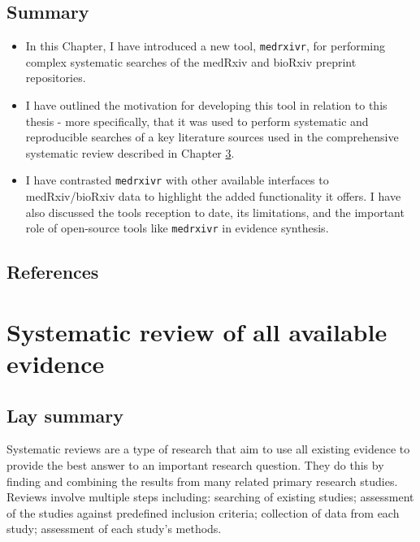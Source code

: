 \documentclass[a4paper, twoside]{templates/ociamthesis}
\begin{document}
\hypertarget{summary-1}{%
\section{Summary}\label{summary-1}}

\begin{itemize}
\item
  In this Chapter, I have introduced a new tool, \texttt{medrxivr}, for performing complex systematic searches of the medRxiv and bioRxiv preprint repositories.
\item
  I have outlined the motivation for developing this tool in relation to this thesis - more specifically, that it was used to perform systematic and reproducible searches of a key literature sources used in the comprehensive systematic review described in Chapter \ref{sys-rev-heading}.
\item
  I have contrasted \texttt{medrxivr} with other available interfaces to medRxiv/bioRxiv data to highlight the added functionality it offers. I have also discussed the tools reception to date, its limitations, and the important role of open-source tools like \texttt{medrxivr} in evidence synthesis.
\end{itemize}

\newpage

\hypertarget{references-1}{%
\section{References}\label{references-1}}



\hypertarget{sys-rev-heading}{%
\chapter{Systematic review of all available evidence}\label{sys-rev-heading}}

\minitoc 

\hypertarget{lay-summary-2}{%
\section{Lay summary}\label{lay-summary-2}}

Systematic reviews are a type of research that aim to use all existing evidence to provide the best answer to an important research question. They do this by finding and combining the results from many related primary research studies. Reviews involve multiple steps including: searching of existing studies; assessment of the studies against predefined inclusion criteria; collection of data from each study; assessment of each study's methods.
\end{document}
